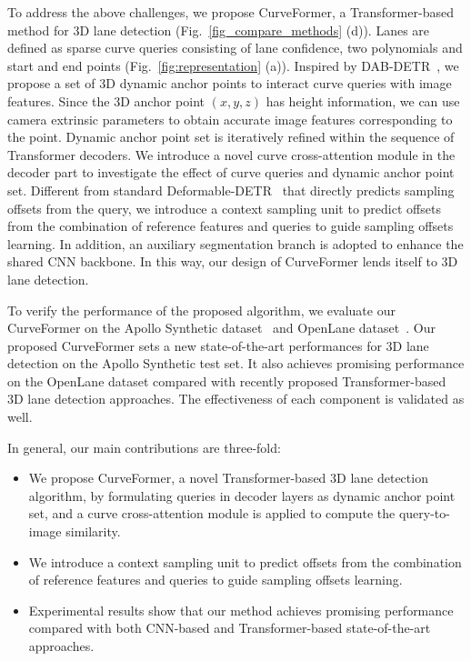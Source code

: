\documentclass[letterpaper, 10 pt, conference]{ieeeconf}
\begin{document}
To address the above challenges, we propose CurveFormer, a Transformer-based method for 3D lane detection (Fig.~\ref{fig_compare_methods} (d)). Lanes are defined as sparse curve queries consisting of lane confidence, two polynomials and start and end points (Fig.~\ref{fig:representation} (a)). Inspired by DAB-DETR~\cite{liu2022dab}, we propose a set of 3D dynamic anchor points to interact curve queries with image features. Since the 3D anchor point $(x,y,z)$ has height information, we can use camera extrinsic parameters to obtain accurate image features corresponding to the point. Dynamic anchor point set is iteratively refined within the sequence of Transformer decoders. We introduce a novel curve cross-attention module in the decoder part to investigate the effect of curve queries and dynamic anchor point set. Different from standard Deformable-DETR~\cite{zhu2020deformable } that directly predicts sampling offsets from the query, we introduce a context sampling unit to predict offsets from the combination of reference features and queries to guide sampling offsets learning. 
In addition, an auxiliary segmentation branch is adopted to enhance the shared CNN backbone. In this way, our design of CurveFormer lends itself to 3D lane detection.

To verify the performance of the proposed algorithm, we evaluate our CurveFormer on the Apollo Synthetic dataset~\cite{guo2020gen} and OpenLane dataset~\cite{chen2022persformer}. Our proposed CurveFormer sets a new state-of-the-art performances for 3D lane detection on the Apollo Synthetic test set. It also achieves promising performance on the OpenLane dataset compared with recently proposed Transformer-based 3D lane detection approaches. The effectiveness of each component is validated as well.

In general, our main contributions are three-fold:
\begin{itemize}
    \item We propose CurveFormer, a novel Transformer-based 3D lane detection algorithm, by formulating queries in decoder layers as dynamic anchor point set, and a curve cross-attention module is applied to compute the query-to-image similarity.
    
    \item We introduce a context sampling unit to predict offsets from the combination of reference features and queries to guide sampling offsets learning.
    
    \item Experimental results show that our method achieves promising performance compared with both CNN-based and Transformer-based state-of-the-art approaches.
\end{itemize}
\end{document}

